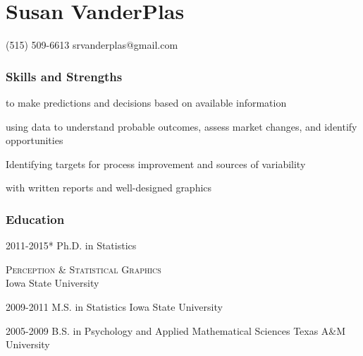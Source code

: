 \documentclass[10pt]{tccv}
\begin{document}
\part{Susan VanderPlas}

    {(515) 509-6613}
    {srvanderplas@gmail.com}

\section{Skills and Strengths}
\begin{description}[leftmargin=*]
\item [Statistical modeling] to make predictions and decisions based on available information
\item [Risk assessment,] using data to understand probable outcomes, assess market changes, and identify opportunities
\item [Optimization] Identifying targets for process improvement and sources of variability
\item [Communicating and summarizing information] with written reports and well-designed graphics
\end{description}

\section{Education}
\begin{yearlist}
\item{2011-2015*}
     {Ph.D. in Statistics}
     {\begin{minipage}{.32\textwidth}\textsc{\small Perception \& Statistical Graphics}\\ Iowa State University\end{minipage}}
\item{2009-2011}
     {M.S. in Statistics}
     {Iowa State University}
\item{2005-2009}
     {B.S. in Psychology and Applied Mathematical Sciences}
     {Texas A\&M University}
\end{yearlist}
\end{document}
